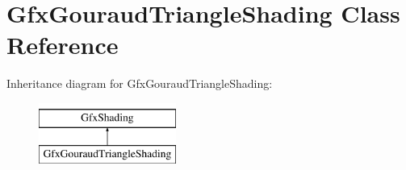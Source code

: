 \hypertarget{class_gfx_gouraud_triangle_shading}{}\section{Gfx\+Gouraud\+Triangle\+Shading Class Reference}
\label{class_gfx_gouraud_triangle_shading}
Inheritance diagram for Gfx\+Gouraud\+Triangle\+Shading\+:\begin{figure}[H]
\begin{center}
\leavevmode
\includegraphics[height=2.000000cm]{class_gfx_gouraud_triangle_shading}
\end{center}
\end{figure}
